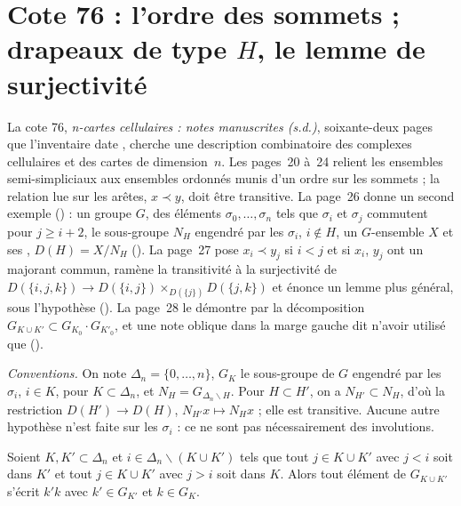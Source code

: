 \section[Cote 76 : l'ordre des sommets ; drapeaux de type H, le lemme de surjectivité]{Cote 76 : l'ordre des sommets ; drapeaux de type $H$, le lemme de surjectivité\protect{}}\label{sec:76}

La cote 76, \emph{n-cartes cellulaires : notes manuscrites (s.d.)}, soixante-deux pages que l'inventaire date \q{[vers 1977]}, cherche une description combinatoire des complexes cellulaires et des cartes de dimension~$n$. Les pages~20 à~24 relient les ensembles semi-simpliciaux aux ensembles ordonnés munis d'un ordre sur les sommets ; la relation lue sur les arêtes, $x \prec y$, doit être transitive. La page~26 donne un second exemple () : un groupe $G$, des éléments $\sigma_0, \ldots, \sigma_n$ tels que $\sigma_i$ et $\sigma_j$ commutent pour $j \geq i + 2$, le sous-groupe $N_H$ engendré par les $\sigma_i$, $i \notin H$, un $G$-ensemble $X$ et ses , $D(H) = X/N_H$ (). La page~27 pose $x_i \prec y_j$ si $i < j$ et si $x_i$, $y_j$ ont un majorant commun, ramène la transitivité à la surjectivité de $D(\{i, j, k\}) \to D(\{i, j\}) \times_{D(\{j\})} D(\{j, k\})$ et énonce un lemme plus général, sous l'hypothèse  (). La page~28 le démontre par la décomposition $G_{K \cup K'} \subset G_{K_0} \cdot G_{K'_0}$, et une note oblique dans la marge gauche dit n'avoir utilisé que  ().

\noindent\emph{Conventions.} On note $\Delta_n = \{0, \ldots, n\}$, $G_K$ le sous-groupe de $G$ engendré par les $\sigma_i$, $i \in K$, pour $K \subset \Delta_n$, et $N_H = G_{\Delta_n \smallsetminus H}$. Pour $H \subset H'$, on a $N_{H'} \subset N_H$, d'où la restriction $D(H') \to D(H)$, $N_{H'}x \mapsto N_Hx$ ; elle est transitive. Aucune autre hypothèse n'est faite sur les $\sigma_i$ : ce ne sont pas nécessairement des involutions.

\begin{lemme}\label{lem:76-produit}
Soient $K, K' \subset \Delta_n$ et $i \in \Delta_n \smallsetminus (K \cup K')$ tels que tout $j \in K \cup K'$ avec $j < i$ soit dans $K'$ et tout $j \in K \cup K'$ avec $j > i$ soit dans $K$. Alors tout élément de $G_{K \cup K'}$ s'écrit $k'k$ avec $k' \in G_{K'}$ et $k \in G_K$.
\end{lemme}

